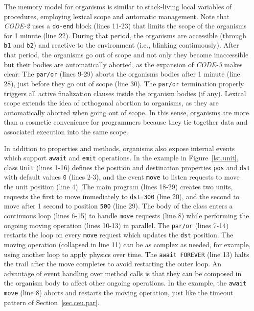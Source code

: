 \documentclass{acm_proc_article-sp}
\newcommand{\code}[1] {{\small{\texttt{#1}}}}
\newcommand{\1}{\;}
\newcommand{\2}{\;\;}
\newcommand{\3}{\;\;\;}
\newcommand{\5}{\;\;\;\;\;}
\begin{document}
%

The memory model for organisms is similar to stack-living local variables of 
procedures, employing lexical scope and automatic management.
Note that \emph{CODE-2} uses a \code{do-end} block (lines 11-23) that limits 
the scope of the organisms for 1 minute (line 22).
%
During that period, the organisms are accessible (through \code{b1} and 
\code{b2}) and reactive to the environment (i.e., blinking continuously).
%
After that period, the organisms go out of scope and not only they become 
inaccessible but their bodies are automatically aborted, as the expansion of 
\emph{CODE-3} makes clear:
%
The \code{par/or} (lines 9-29) aborts the organisms bodies after 1 minute (line 
28), just before they go out of scope (line 30).
%
The \code{par/or} termination properly triggers all active finalization clauses 
inside the organism bodies (if any).
%
Lexical scope extends the idea of orthogonal abortion to organisms, as they are 
automatically aborted when going out of scope.
%
In this sense, organisms are more than a cosmetic convenience for programmers 
because they tie together data and associated execution into the same scope.

In addition to properties and methods, organisms also expose internal events 
which support \code{await} and \code{emit} operations.
%
In the example in Figure~\ref{lst.unit}, class \code{Unit} (lines 1-16) defines 
the position and destination properties \code{pos} and \code{dst} with default 
values \code{0} (lines 2-3), and the event \code{move} to listen requests to 
move the unit position (line 4).
%
The main program (lines 18-29) creates two units, requests the first to move 
immediately to \code{dst=300} (line 20), and the second to move after 1 second 
to position \code{500} (line 29).
%
The body of the class enters a continuous loop (lines 6-15) to handle 
\code{move} requests (line 8) while performing the ongoing moving operation 
(lines 10-13) in parallel.
The \code{par/or} (lines 7-14) restarts the loop on every \code{move} request 
which updates the \code{dst} position.
%
The moving operation (collapsed in line 11) can be as complex as needed, for 
example, using another loop to apply physics over time.
The \code{await FOREVER} (line 13) halts the trail after the move completes to 
avoid restarting the outer loop.
%
An advantage of event handling over method calls is that they can be composed 
in the organism body to affect other ongoing operations.
In the example, the \code{await move} (line 8) aborts and restarts the moving 
operation, just like the timeout pattern of Section~\ref{sec.ceu.par}.
\end{document}
